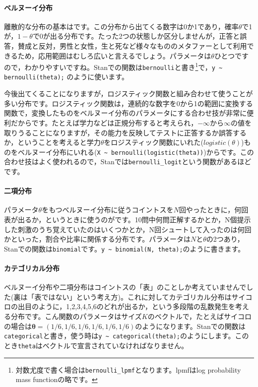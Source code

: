 \documentclass{ltjsbook}
\begin{document}
\paragraph{ベルヌーイ分布}
離散的な分布の基本はです。この分布から出てくる数字は0か1であり，確率$\theta$で1が，$1-\theta$で0が出る分布です。たった2つの状態しか区分しませんが，正答と誤答，賛成と反対，男性と女性，生と死など様々なもののメタファーとして利用できるため，応用範囲はむしろ広いと言えるでしょう。パラメータは$\theta$ひとつですので，わかりやすいですね。Stanでの関数は\texttt{bernoulli}と書き\footnote{対数尤度で書く場合は\verb|bernoulli_lpmf|となります。lpmfはlog probability mass functionの略です。}で，\verb|y ~ bernoulli(theta);| のように使います。

今後出てくることになりますが，ロジスティック関数と組み合わせて使うことが多い分布です。ロジスティック関数は，連続的な数字を0から1の範囲に変換する関数で，変換したものをベルヌーイ分布のパラメータにする合わせ技が非常に便利だからです。たとえば学力などは正規分布すると考えられ，$-\infty$から$\infty$の値を取りうることになりますが，その能力を反映してテストに正答するか誤答するか，ということを考えると学力$\theta$をロジスティック関数にいれた($logistic(\theta)$)ものをベルヌーイ分布にいれる(\verb|X ~ bernoulli(logistic(theta))|)からです。この合わせ技はよく使われるので，Stanでは\verb|bernoulli_logit|という関数があるほどです。
\paragraph{二項分布}
パラメータ$\theta$をもつベルヌーイ分布に従うコイントスを$N$回やったときに，何回表が出るか，というときに使うのがです。10問中何問正解するかとか，N個提示した刺激のうち覚えていたのはいくつかとか，N回シュートして入ったのは何回かといった，割合や比率に関係する分布です。パラメータは$N$と$\theta$の2つあり，Stanでの関数は\texttt{binomial}です。\verb|y ~ binomial(N, theta);|のように書きます。

\paragraph{カテゴリカル分布}
ベルヌーイ分布や二項分布はコイントスの「表」のことしか考えていませんでした(裏は「表ではない」という考え方)。これに対してカテゴリカル分布はサイコロの出目のように，1,2,3,4,5,6のどれが出るか，という多段階の乱数発生を考える分布です。こん関数のパラメータはサイズ$K$のベクトルで，たとえばサイコロの場合は$\bm{\theta}=(1/6,1/6,1/6,1/6,1/6,1/6)$のようになります。Stanでの関数は\texttt{categorical}と書き，使う時は\verb|y ~ categorical(theta);|のようにします。このとき\verb|theta|はベクトルで宣言されていなければなりません。
\end{document}
